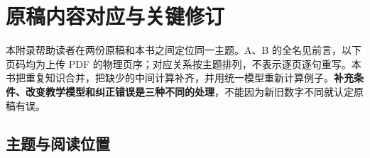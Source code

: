 \chapter{原稿内容对应与关键修订}\label{app:sources}

本附录帮助读者在两份原稿和本书之间定位同一主题。A、B 的全名见前言，以下页码均为上传 PDF 的物理页序；对应关系按主题排列，不表示逐页逐句重写。本书把重复知识合并，把缺少的中间计算补齐，并用统一模型重新计算例子。\textbf{补充条件、改变教学模型和纠正错误是三种不同的处理}，不能因为新旧数字不同就认定原稿有误。

\section{主题与阅读位置}

\begingroup
\small
{}
\renewcommand{\arraystretch}{1.20}
